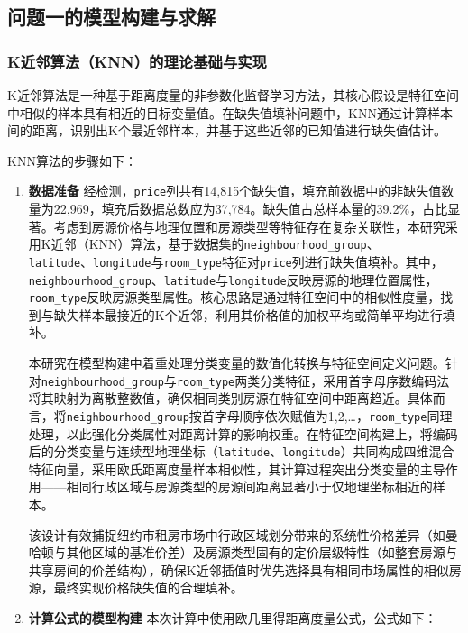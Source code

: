 \documentclass[12pt]{article}
\begin{document}
\begin{CJK}{UTF8}{gbsn}
	\subsection{问题一的模型构建与求解}
	\subsubsection{K近邻算法（KNN）的理论基础与实现}
	K近邻算法是一种基于距离度量的非参数化监督学习方法，其核心假设是特征空间中相似的样本具有相近的目标变量值。在缺失值填补问题中，KNN通过计算样本间的距离，识别出K个最近邻样本，并基于这些近邻的已知值进行缺失值估计。
	
	KNN算法的步骤如下：
	
	\begin{enumerate}
		\item \textbf{数据准备}  
		经检测，\texttt{price}列共有14,815个缺失值，填充前数据中的非缺失值数量为22,969，填充后数据总数应为37,784。缺失值占总样本量的39.2\%，占比显著。考虑到房源价格与地理位置和房源类型等特征存在复杂关联性，本研究采用K近邻（KNN）算法，基于数据集的\texttt{neighbourhood\_group}、\\\texttt{latitude}、\texttt{longitude}与\texttt{room\_type}特征对\texttt{price}列进行缺失值填补。其中，\texttt{neighbourhood\_group}、\texttt{latitude}与\texttt{longitude}反映房源的地理位置属性，\texttt{room\_type}反映房源类型属性。核心思路是通过特征空间中的相似性度量，找到与缺失样本最接近的K个近邻，利用其价格值的加权平均或简单平均进行填补。
		
		本研究在模型构建中着重处理分类变量的数值化转换与特征空间定义问题。针对\texttt{neighbourhood\_group}与\texttt{room\_type}两类分类特征，采用首字母序数编码法将其映射为离散整数值，确保相同类别房源在特征空间中距离趋近。具体而言，将\texttt{neighbourhood\_group}按首字母顺序依次赋值为1,2,\dots，\texttt{room\_type}同理处理，以此强化分类属性对距离计算的影响权重。在特征空间构建上，将编码后的分类变量与连续型地理坐标（\texttt{latitude}、\texttt{longitude}）共同构成四维混合特征向量，采用欧氏距离度量样本相似性，其计算过程突出分类变量的主导作用——相同行政区域与房源类型的房源间距离显著小于仅地理坐标相近的样本。
		
		该设计有效捕捉纽约市租房市场中行政区域划分带来的系统性价格差异（如曼哈顿与其他区域的基准价差）及房源类型固有的定价层级特性（如整套房源与共享房间的价差结构），确保K近邻插值时优先选择具有相同市场属性的相似房源，最终实现价格缺失值的合理填补。
		
		\item \textbf{计算公式的模型构建}  
		本次计算中使用欧几里得距离度量公式，公式如下：
		

\end{enumerate}
\end{CJK}
\end{document}
